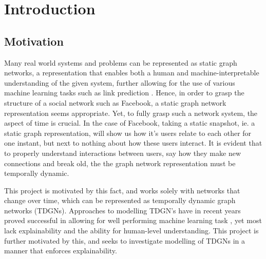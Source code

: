 \section{Introduction}
\label{sec:Intro}



\subsection{Motivation}
\label{sec:Intro:Motivation}
Many real world systems and problems can be represented as static graph networks, a representation that enables both a human and machine-interpretable understanding of the given system, further allowing for the use of various machine learning tasks such as link prediction 
.
Hence, in order to grasp the structure of a social network such as Facebook, a static graph network representation seems appropriate.
Yet, to fully grasp such a network system, the aspect of time is crucial.
In the case of Facebook, taking a static snapshot, ie. a static graph representation, will show us how it's users relate to each other for one instant, but next to nothing about how these users interact.
It is evident that to properly understand interactions between users, say how they make new connections and break old, the the graph network representation must be temporally dynamic.

This project is motivated by this fact, and works solely with networks that change over time, which can be represented as temporally dynamic graph networks (TDGNs).
Approaches to modelling TDGN's have in recent years proved successful in allowing for well performing machine learning task
, yet most lack explainability and the ability for human-level understanding.
This project is further motivated by this, and seeks to investigate modelling of TDGNs in a manner that enforces explainability. 

